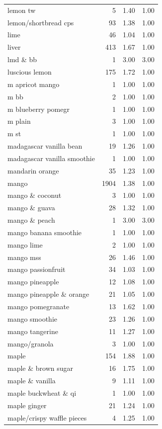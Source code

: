 \begin{table}
\begin{tabular}{lrrr}
lemon tw & 5 & 1.40 & 1.00 \\
lemon/shortbread cps & 93 & 1.38 & 1.00 \\
lime & 46 & 1.04 & 1.00 \\
liver & 413 & 1.67 & 1.00 \\
lmd \& bb & 1 & 3.00 & 3.00 \\
luscious lemon & 175 & 1.72 & 1.00 \\
m apricot mango & 1 & 1.00 & 1.00 \\
m bb & 2 & 1.00 & 1.00 \\
m blueberry pomegr & 1 & 1.00 & 1.00 \\
m plain & 3 & 1.00 & 1.00 \\
m st & 1 & 1.00 & 1.00 \\
madagascar vanilla bean & 19 & 1.26 & 1.00 \\
madagascar vanilla smoothie & 1 & 1.00 & 1.00 \\
mandarin orange & 35 & 1.23 & 1.00 \\
mango & 1904 & 1.38 & 1.00 \\
mango \& coconut & 3 & 1.00 & 1.00 \\
mango \& guava & 28 & 1.32 & 1.00 \\
mango \& peach & 1 & 3.00 & 3.00 \\
mango banana smoothie & 1 & 1.00 & 1.00 \\
mango lime & 2 & 1.00 & 1.00 \\
mango mss & 26 & 1.46 & 1.00 \\
mango passionfruit & 34 & 1.03 & 1.00 \\
mango pineapple & 12 & 1.08 & 1.00 \\
mango pineapple \& orange & 21 & 1.05 & 1.00 \\
mango pomegranate & 13 & 1.62 & 1.00 \\
mango smoothie & 23 & 1.26 & 1.00 \\
mango tangerine & 11 & 1.27 & 1.00 \\
mango/granola & 3 & 1.00 & 1.00 \\
maple & 154 & 1.88 & 1.00 \\
maple \& brown sugar & 16 & 1.75 & 1.00 \\
maple \& vanilla & 9 & 1.11 & 1.00 \\
maple buckwheat \& qi & 1 & 1.00 & 1.00 \\
maple ginger & 21 & 1.24 & 1.00 \\
maple/crispy waffle pieces & 4 & 1.25 & 1.00 \\

\end{tabular}
\end{table}
